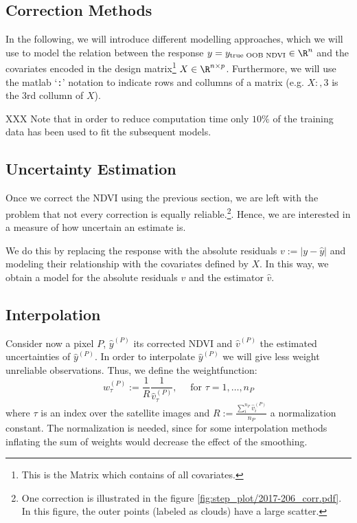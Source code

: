 {    \subsection{Correction Methods}{
        \label{sec:corr_methods}
        In the following, we will introduce different modelling approaches, which we will use to model the relation between the response $y = y_{\text{true OOB NDVI}}\in \R^n$ and the covariates encoded in the design matrix\footnote{This is the Matrix which contains of all covariates.} $X\in\R^{n \times p}$. Furthermore, we will use the matlab `\texttt{:}' notation to indicate rows and collumns of a matrix (e.g. $X{:,3}$ is the $3$rd collumn of $X$). 

        XXX Note that in order to reduce computation time only $10\%$ of the training data has been used to fit the subsequent models.

        
    }
    
    \subsection{Uncertainty Estimation}{
        \label{sec:corr_uncertainty}
        Once we correct the NDVI using the previous section, we are left with the problem that not every correction is equally reliable.\footnote{One correction is illustrated in the figure \ref{fig:step_plot/2017-206_corr.pdf}. In this figure, the outer points (labeled as clouds) have a large scatter.}. Hence, we are interested in a measure of how uncertain an estimate is. 

        We do this by replacing the response with the absolute residuals $v := \left|y -\hat y\right|$ and modeling their relationship with the covariates defined by $X$.  In this way, we obtain a model for the absolute residuals $v$ and the estimator $\hat v$.  
    }

    \subsection{Interpolation}{
        Consider now a pixel $P$, $\hat y^{(P)}$ its corrected NDVI and $\hat v^{(P)}$ the estimated uncertainties of $\hat y^{(P)}$. In order to interpolate $\hat y^{(P)}$ we will give less weight unreliable observations. Thus, we define the weightfunction: 
        \begin{equation}
            w^{(P)}_\tau:=\frac{1}{R} \frac{1}{\hat v^{(P)}_\tau}, 
            \quad \text{ for } \tau=1,\dots, n_P
        \end{equation}  
        where $\tau$ is an index over the satellite images and $R:=\frac{\sum_i^{n_P}\hat v^{(P)}_i}{n_P}$ a normalization constant. The normalization is needed, since for some interpolation methods inflating the sum of weights would decrease the effect of the smoothing. 
    }
}

